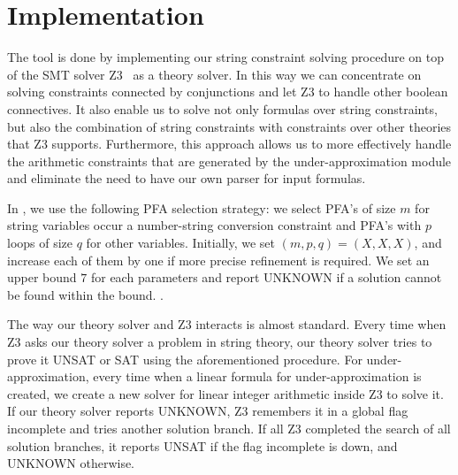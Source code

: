 \documentclass[sigplan,review,anonymous]{acmart}\settopmatter{printfolios=true,printccs=false,printacmref=false}
\begin{document}


\section{Implementation}\label{section:implementation}
The tool {\tool} is done by implementing our string constraint solving procedure on top of the SMT solver Z3~\cite{z3} as a theory solver. In this way we can concentrate on solving constraints connected by conjunctions and let Z3 to handle other boolean connectives. It also enable us to solve not only formulas over string constraints, but also the combination of string constraints with constraints over other theories that Z3 supports. Furthermore, this approach allows us to more effectively handle the arithmetic constraints that are generated by the under-approximation module and eliminate the need to have our own parser for input formulas. 

In {\tool}, we use the following PFA selection strategy: we select PFA's of size $m$ for string variables occur a number-string conversion constraint and PFA's with $p$ loops of size $q$ for other variables. Initially, we set $(m,p,q)=(X,X,X)$, and increase each of them by one if more precise refinement is required. We set an upper bound $7$ for each parameters and report UNKNOWN if a solution cannot be found within the bound. .

The way our theory solver and Z3 interacts is almost standard. Every time when Z3 asks our theory solver a problem in string theory, our theory solver tries to prove it UNSAT or SAT using the aforementioned procedure. For under-approximation, every time when a linear formula for under-approximation is created, we create a new solver for linear integer arithmetic inside Z3 to solve it. If our theory solver reports UNKNOWN, Z3 remembers it in a global flag \textsf{incomplete} and tries another solution branch. If all Z3 completed the search of all solution branches, it reports UNSAT if the flag \textsf{incomplete} is down, and UNKNOWN otherwise.



\end{document}
